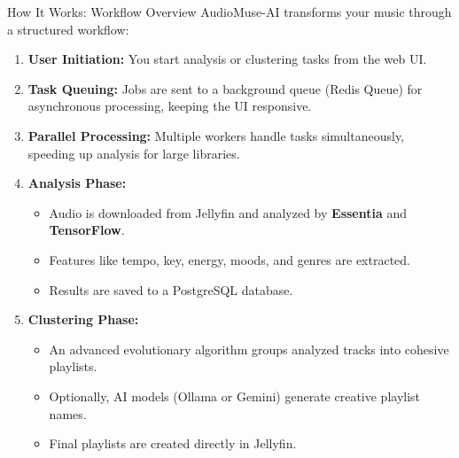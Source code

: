 \documentclass{beamer}
\begin{document}
\begin{frame}{How It Works: Workflow Overview}
    AudioMuse-AI transforms your music through a structured workflow:
    \begin{enumerate}
        \item \textbf{User Initiation:} You start analysis or clustering tasks from the web UI.
        \item \textbf{Task Queuing:} Jobs are sent to a background queue (Redis Queue) for asynchronous processing, keeping the UI responsive.
        \item \textbf{Parallel Processing:} Multiple workers handle tasks simultaneously, speeding up analysis for large libraries.
        \item \textbf{Analysis Phase:}
        \begin{itemize}
            \item Audio is downloaded from Jellyfin and analyzed by \textbf{Essentia} and \textbf{TensorFlow}.
            \item Features like tempo, key, energy, moods, and genres are extracted.
            \item Results are saved to a PostgreSQL database.
        \end{itemize}
        \item \textbf{Clustering Phase:}
        \begin{itemize}
            \item An advanced evolutionary algorithm groups analyzed tracks into cohesive playlists.
            \item Optionally, AI models (Ollama or Gemini) generate creative playlist names.
            \item Final playlists are created directly in Jellyfin.
        \end{itemize}
    \end{enumerate}
\end{frame}
\end{document}
